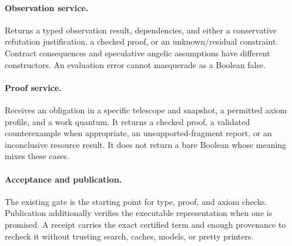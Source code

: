 \documentclass[11pt,a4paper]{article}
\theoremstyle{definition}
\theoremstyle{remark}
\begin{document}
\paragraph{Observation service.}
Returns a typed observation result, dependencies, and either a conservative
refutation justification, a checked proof, or an unknown/residual constraint.
Contract consequences and speculative angelic assumptions have different
constructors. An evaluation error cannot masquerade as a Boolean false.

\paragraph{Proof service.}
Receives an obligation in a specific telescope and snapshot, a permitted axiom
profile, and a work quantum. It returns a checked proof, a validated
counterexample when appropriate, an unsupported-fragment report, or an
inconclusive resource result. It does not return a bare Boolean whose meaning
mixes these cases.

\paragraph{Acceptance and publication.}
The existing gate is the starting point for type, proof, and axiom checks.
Publication additionally verifies the executable representation when one is
promised. A receipt carries the exact certified term and enough provenance to
recheck it without trusting search, caches, models, or pretty printers.
\end{document}
